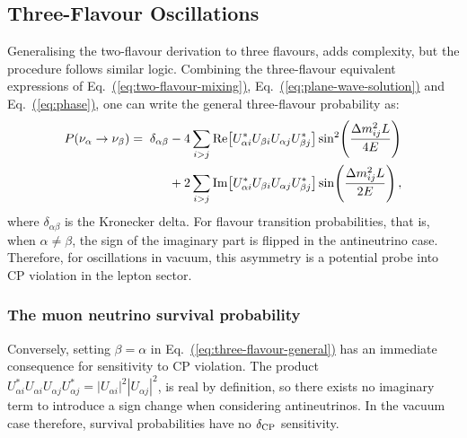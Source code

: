 \subsection{Three-Flavour Oscillations}
\label{sec:three-flavour}
Generalising the two-flavour derivation to three flavours, adds complexity, but the procedure follows similar logic. 
Combining the three-flavour equivalent expressions of Eq.~\hyperref[eq:two-flavour-mixing]{(\ref{eq:two-flavour-mixing})}, Eq.~\hyperref[eq:plane-wave-solution]{(\ref{eq:plane-wave-solution})} and Eq.~\hyperref[eq:phase]{(\ref{eq:phase})}, one can write the general three-flavour probability as:
\begin{align}
    P(\nu_\alpha \to \nu_\beta) = \;\delta_{\alpha\beta}
    &- 4\sum_{i>j}\mathrm{Re}\!\left[U^{*}_{\alpha i}U_{\beta i}U_{\alpha j}U^{*}_{\beta j}\right]
        \sin^{2}\!\left(\frac{\Delta m^{2}_{ij}L}{4E}\right) \nonumber \\
    &+ 2\sum_{i>j}\mathrm{Im}\!\left[U^{*}_{\alpha i}U_{\beta i}U_{\alpha j}U^{*}_{\beta j}\right]
        \sin\!\left(\frac{\Delta m^{2}_{ij}L}{2E}\right),
    \label{eq:three-flavour-general}
\end{align}
where $\delta_{\alpha\beta}$ is the Kronecker delta. For flavour transition probabilities, that is, when $\alpha \neq \beta$, the sign of the imaginary part is flipped in the antineutrino case. Therefore, for oscillations in vacuum, this asymmetry is a potential probe into CP violation in the lepton sector.

\subsubsection*{The muon neutrino survival probability}

Conversely, setting $\beta = \alpha$ in Eq.~\hyperref[eq:three-flavour-general]{(\ref{eq:three-flavour-general})} has an immediate consequence for sensitivity to CP violation.
The product $U^{*}_{\alpha i}U_{\alpha i}U_{\alpha j}U^{*}_{\alpha j} = |U_{\alpha i}|^{2}|U_{\alpha j}|^{2}$, is real by definition, so there exists no imaginary term to introduce a sign change when considering antineutrinos.
In the vacuum case therefore, survival probabilities have no $\delta_{\rm CP}$ sensitivity.

